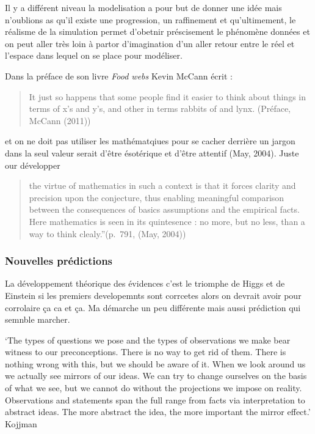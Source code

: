 Il y a différent niveau la modelisation a pour but de donner une idée
mais n'oublions as qu'il existe une progression, un raffinement et
qu'ultimement, le réalisme de la simulation permet d'obetnir
préscisement le phénomène données et on peut aller très loin à partor
d'imagination d'un aller retour entre le réel et l'espace dans lequel on
se place pour modéliser.

Dans la préface de son livre \emph{Food webs} Kevin McCann écrit :

\begin{quote}
\guillemotleft It just so happens that some people find it easier to
think about things in terms of x's and y's, and other in terms rabbits
of and lynx. \guillemotright (Préface, McCann (2011))
\end{quote}

et on ne doit pas utiliser les mathématqiues pour se cacher derrière un
jargon dans la seul valeur serait d'être ésotérique et d'être attentif
(May, 2004). Juste our développer

\begin{quote}
the virtue of mathematics in such a context is that it forces clarity
and precision upon the conjecture, thus enabling meaningful comparison
between the consequences of basics assumptions and the empirical facts.
Here mathematics is seen in its quintesence : no more, but no less, than
a way to think clealy.''(p.~791, (May, 2004))
\end{quote}

\subsubsection*{Nouvelles prédictions}\label{nouvelles-pruxe9dictions}

La développement théorique des évidences c'est le triomphe de Higgs et
de Einstein si les premiers developemnts sont corrcetes alors on devrait
avoir pour corrolaire ça ca et ça. Ma démarche un peu différente mais
aussi prédiction qui semnble marcher.

`The types of questions we pose and the types of observations we make
bear witness to our preconceptions. There is no way to get rid of them.
There is nothing wrong with this, but we should be aware of it. When we
look around us we actually see mirrors of our ideas. We can try to
change ourselves on the basis of what we see, but we cannot do without
the projections we impose on reality. Observations and statements span
the full range from facts via interpretation to abstract ideas. The more
abstract the idea, the more important the mirror effect.' Kojjman

